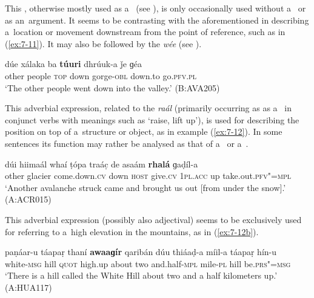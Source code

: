  This , otherwise mostly used as a~ (see ), is only occasionally used without a~ or  as an~argument. It seems to be contrasting with the aforementioned  in describing a~location or movement downstream from the point of reference, such as in (\ref{ex:7-11}). It may also be followed by the  \textit{wée} (see ). 

\begin{exe}
\ex
\label{ex:7-11}
\gll dúe xálaka ba \textbf{túuri} dhrúuk-a ǰe ɡéa  \\
other people \textsc{top} down gorge-\textsc{obl}  down.to go.\textsc{pfv.pl} \\
\glt `The other people went down into the valley.' (B:AVA205)
\end{exe}

 This adverbial expression, related to the  \textit{raál} (primarily occurring as as a~ in conjunct verbs with meanings such as `raise, lift up'), is used for describing the position on top of a~structure or object, as in example (\ref{ex:7-12}). In some sentences its function may rather be analysed as that of a~ or a~.

\largerpage
\ea
\label{ex:7-12}
\gll dúi hiimaál whaí ṭópa traác̣ de asaám  \textbf{rhalá} ɡaḍíl-a\\
other glacier come.down.\textsc{cv} down \textsc{host} give.\textsc{cv} \textsc{1pl.acc} up take.out.\textsc{pfv"=mpl}\\
\glt `Another avalanche struck came and brought us out [from under the snow].' (A:ACR015)
\z

 This adverbial expression (possibly also adjectival) seems to be exclusively used for referring to a~high elevation in the mountains, as in (\ref{ex:7-12b}).

\begin{exe}
\ex
\label{ex:7-12b}
\gll paṇáar-u táapaṛ thaní \textbf{awaaɡír} qaribán dúu thiáaḍ-a míil-a táapaṛ hín-u\\
white-\textsc{msg} hill \textsc{quot} high.up about two and.half-\textsc{mpl} mile-\textsc{pl} hill be.\textsc{prs"=msg}\\
\glt `There is a hill called the White Hill about two and a half kilometers up.' (A:HUA117)
\end{exe}

